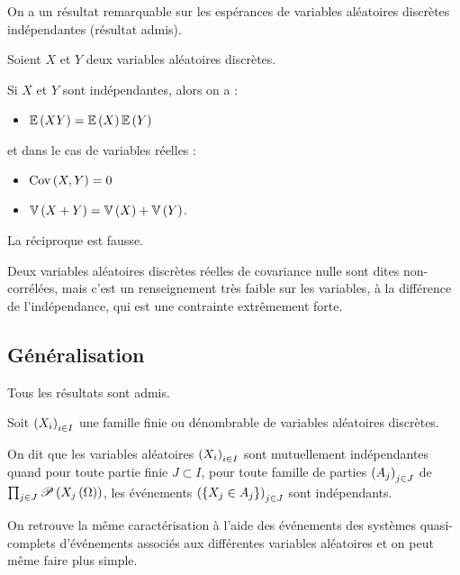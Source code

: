 On a un résultat remarquable sur les espérances de variables aléatoires discrètes indépendantes (résultat admis).

\begin{prop}
Soient \(X\) et \(Y\) deux variables aléatoires discrètes.

Si \(X\) et \(Y\) sont indépendantes, alors on a :

\begin{itemize}
    \item \(\operatorname{\mathbb{E}}\left(XY\right)=\operatorname{\mathbb{E}}\left(X\right)\operatorname{\mathbb{E}}\left(Y\right)\)
\end{itemize}

et dans le cas de variables réelles :

\begin{itemize}
    \item \(\operatorname{Cov}\left(X,Y\right)=0\) \\
    \item \(\operatorname{\mathbb{V}}\left(X+Y\right)=\operatorname{\mathbb{V}}\left(X\right)+\operatorname{\mathbb{V}}\left(Y\right)\).
\end{itemize}
\end{prop}

\begin{rem}
La réciproque est fausse.

Deux variables aléatoires discrètes réelles de covariance nulle sont dites non-corrélées, mais c'est un renseignement très faible sur les variables, à la différence de l'indépendance, qui est une contrainte extrêmement forte.
\end{rem}

\subsection{Généralisation}

Tous les résultats sont admis.

\begin{defi}
Soit \(\left(X_i\right)_{i\in I}\) une famille finie ou dénombrable de variables aléatoires discrètes.

On dit que les variables aléatoires \(\left(X_i\right)_{i\in I}\) sont mutuellement indépendantes quand pour toute partie finie \(J\subset I\), pour toute famille de parties \(\left(A_j\right)_{j\in J}\) de \(\prod_{j\in J}\mathscr{P}\left(X_j\left(\Omega\right)\right)\), les événements \(\left(\left\lbrace X_j\in A_j\right\rbrace\right)_{j\in J}\) sont indépendants.
\end{defi}

On retrouve la même caractérisation à l'aide des événements des systèmes quasi-complets d'événements associés aux différentes variables aléatoires et on peut même faire plus simple.

